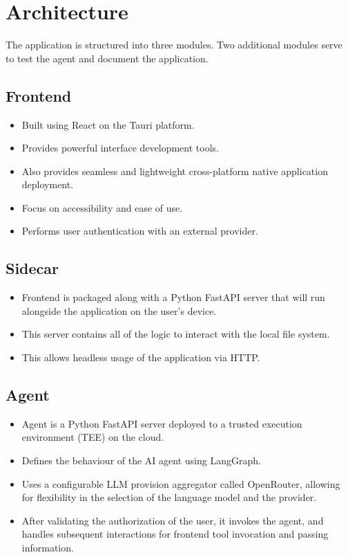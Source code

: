 \section{Architecture}

The application is structured into three modules.
Two additional modules serve to test the agent and document the application.

\subsection{Frontend}

\begin{itemize}
    \item Built using React on the Tauri platform.
    \item Provides powerful interface development tools.
    \item Also provides seamless and lightweight cross-platform native application deployment.
    \item Focus on accessibility and ease of use.
    \item Performs user authentication with an external provider.
\end{itemize}

\subsection{Sidecar}

\begin{itemize}
    \item Frontend is packaged along with a Python FastAPI server that will run alongside the application on the user's device.
    \item This server contains all of the logic to interact with the local file system.
    \item This allows headless usage of the application via HTTP.
\end{itemize}

\subsection{Agent}

\begin{itemize}
    \item Agent is a Python FastAPI server deployed to a trusted execution environment (TEE) on the cloud.
    \item Defines the behaviour of the AI agent using LangGraph.
    \item Uses a configurable LLM provision aggregator called OpenRouter, allowing for flexibility in the selection of the language model and the provider.
    \item After validating the authorization of the user, it invokes the agent, and handles subsequent interactions for frontend tool invocation and passing information.
\end{itemize}

